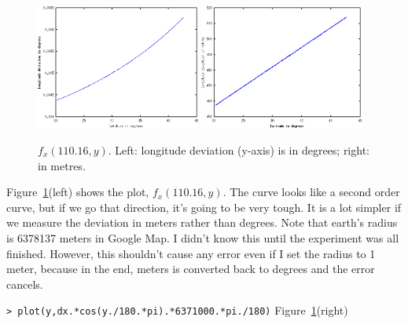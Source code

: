 \documentclass[a4paper]{article}
\begin{document}
\begin{figure}[htb]
\begin{center}
\includegraphics[width=0.48\textwidth]{fxy-degree.png}
\includegraphics[width=0.48\textwidth]{fxy-metre.png}
\end{center}
\caption{$f_x(110.16,y)$. Left: longitude deviation (y-axis) is in degrees;
right: in metres.}
\label{fig:fxy-degree}
\end{figure}

Figure~\ref{fig:fxy-degree}(left) shows the plot, $f_x(110.16,y)$. The curve
looks like a second order curve, but if we go that direction, it's going to be
very tough.
It is a lot simpler if we measure the deviation in meters rather
than degrees.
Note that earth's radius is 6378137 meters in Google Map.
I didn't know this until the experiment was all finished.
However, this shouldn't cause any error even if I set the radius to 1 meter,
because in the end, meters is converted back to degrees and the error cancels.

\noindent
\verb|> plot(y,dx.*cos(y./180.*pi).*6371000.*pi./180)| \hfill
Figure~\ref{fig:fxy-degree}(right)
\end{document}
